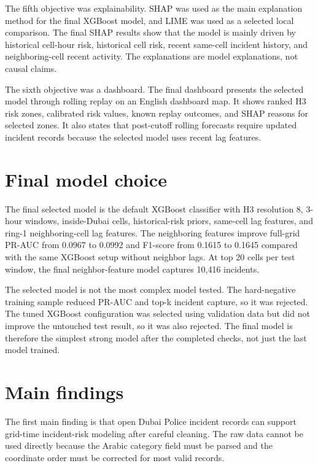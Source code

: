 The fifth objective was explainability. SHAP was used as the main explanation method for the final XGBoost model, and LIME was used as a selected local comparison. The final SHAP results show that the model is mainly driven by historical cell-hour risk, historical cell risk, recent same-cell incident history, and neighboring-cell recent activity. The explanations are model explanations, not causal claims.

The sixth objective was a dashboard. The final dashboard presents the selected model through rolling replay on an English dashboard map. It shows ranked H3 risk zones, calibrated risk values, known replay outcomes, and SHAP reasons for selected zones. It also states that post-cutoff rolling forecasts require updated incident records because the selected model uses recent lag features.

\section{Final model choice}

The final selected model is the default XGBoost classifier with H3 resolution 8, 3-hour windows, inside-Dubai cells, historical-risk priors, same-cell lag features, and ring-1 neighboring-cell lag features. The neighboring features improve full-grid PR-AUC from 0.0967 to 0.0992 and F1-score from 0.1615 to 0.1645 compared with the same XGBoost setup without neighbor lags. At top 20 cells per test window, the final neighbor-feature model captures 10,416 incidents.

The selected model is not the most complex model tested. The hard-negative training sample reduced PR-AUC and top-k incident capture, so it was rejected. The tuned XGBoost configuration was selected using validation data but did not improve the untouched test result, so it was also rejected. The final model is therefore the simplest strong model after the completed checks, not just the last model trained.

\section{Main findings}

The first main finding is that open Dubai Police incident records can support grid-time incident-risk modeling after careful cleaning. The raw data cannot be used directly because the Arabic category field must be parsed and the coordinate order must be corrected for most valid records.

